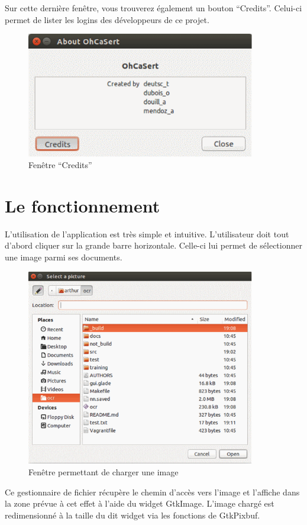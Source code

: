 \documentclass[11pt]{report}
\begin{document}
Sur cette dernière fenêtre, vous trouverez également un bouton ``Credits''. Celui-ci permet de lister les logins des développeurs de ce projet.

\begin{figure}[htbp]
\centering
\includegraphics[width=10cm]{gui-credits.png}
\caption{Fenêtre ``Credits''}
\end{figure}

\section{Le fonctionnement}

L'utilisation de l'application est très simple et intuitive. L'utilisateur doit tout d'abord cliquer sur la grande barre horizontale. Celle-ci lui permet de sélectionner une image parmi ses documents.

\begin{figure}[htbp]
\centering
\includegraphics[width=10cm]{gui-open-file.png}
\caption{Fenêtre permettant de charger une image}
\end{figure}

Ce gestionnaire de fichier récupère le chemin d'accès vers l’image et l’affiche dans la zone prévue à cet effet à l'aide du widget GtkImage. L'image chargé est redimensionné à la taille du dit widget via les fonctions de GtkPixbuf.
\end{document}
